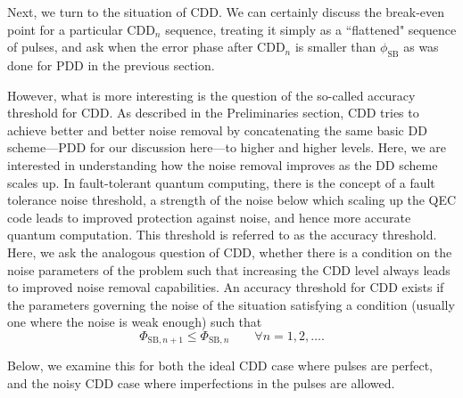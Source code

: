 \documentclass[twocolumn,pra,superscriptaddress]{revtex4-2}
\newcommand{\phiSB}{\phi_\mathrm{SB}}
\newcommand{\CDDn}{\mathrm{CDD}_n}
\begin{document}
Next, we turn to the situation of CDD. We can certainly discuss the break-even point for a particular $\CDDn$ sequence, treating it simply as a ``flattened" sequence of pulses, and ask when the error phase after $\CDDn$ is smaller than $\phiSB$ as was done for PDD in the previous section.  

However, what is more interesting is the question of the so-called accuracy threshold for CDD.
As described in the Preliminaries section, CDD tries to achieve better and better noise removal by concatenating the same basic DD scheme---PDD for our discussion here---to higher and higher levels. Here, we are interested in understanding how the noise removal improves as the DD scheme scales up. In fault-tolerant quantum computing, there is the concept of a fault tolerance noise threshold, a strength of the noise below which scaling up the QEC code leads to improved protection against noise, and hence more accurate quantum computation. This threshold is referred to as the accuracy threshold. Here, we ask the analogous question of CDD, whether there is a condition on the noise parameters of the problem such that increasing the CDD level always leads to improved noise removal capabilities. An accuracy threshold for CDD exists if the parameters governing the noise of the situation satisfying a condition (usually one where the noise is weak enough) such that 
\begin{equation}\label{eq:thresCond}
\Phi_{\mathrm{SB},n+1}\leq\Phi_{\mathrm{SB},n}\qquad\forall n=1,2,\ldots.
\end{equation}

Below, we examine this for both the ideal CDD case where pulses are perfect, and the noisy CDD case where imperfections in the pulses are allowed.

\end{document}
